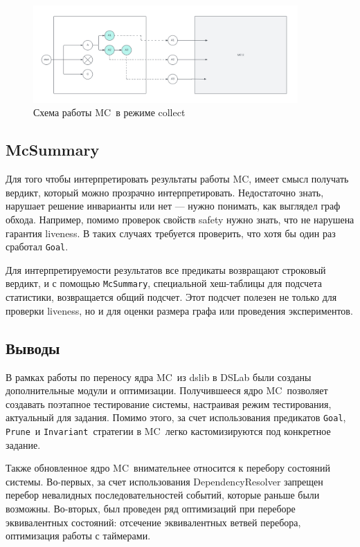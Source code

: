 \documentclass[a4paper,12pt]{extarticle}
\newcommand{\goal}[0]{\texttt{Goal}}
\newcommand{\prune}[0]{\texttt{Prune}}
\newcommand{\invariant}[0]{\texttt{Invariant}}
\newcommand{\mc}[0]{MC}
\begin{document}
\begin{figure}
    \begin{center}
        \includegraphics[width=0.9\textwidth]{img/mc_collect.png}
        \caption{Схема работы \mc\ в режиме collect}            
        \label{pic3}
    \end{center}
\end{figure}

\subsection{McSummary}

Для того чтобы интерпретировать результаты работы \mc, имеет смысл получать вердикт, который можно прозрачно интерпретировать.
Недостаточно знать, нарушает решение инварианты или нет --- нужно понимать, как выглядел граф обхода.
Например, помимо проверок свойств safety нужно знать, что не нарушена гарантия liveness.
В таких случаях требуется проверить, что хотя бы один раз сработал \goal.

Для интерпретируемости результатов все предикаты возвращают строковый вердикт, и с помощью \texttt{McSummary}, специальной хеш-таблицы для подсчета статистики, возвращается общий подсчет.
Этот подсчет полезен не только для проверки liveness, но и для оценки размера графа или проведения экспериментов.

\subsection{Выводы}

В рамках работы по переносу ядра \mc\ из dslib в DSLab были созданы дополнительные модули и оптимизации.
Получившееся ядро \mc\ позволяет создавать поэтапное тестирование системы, настраивая режим тестирования, актуальный для задания.
Помимо этого, за счет использования предикатов \goal, \prune\ и \invariant\ стратегии в \mc\ легко кастомизируются под конкретное задание.

Также обновленное ядро \mc\ внимательнее относится к перебору состояний системы.
Во-первых, за счет использования DependencyResolver запрещен перебор невалидных последовательностей событий, которые раньше были возможны.
Во-вторых, был проведен ряд оптимизаций при переборе эквивалентных состояний: отсечение эквивалентных ветвей перебора, оптимизация работы с таймерами.
\end{document}
